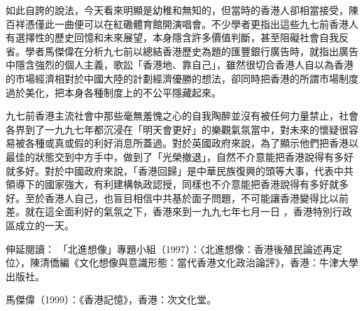 
如此自誇的說法，今天看來明顯是幼稚和無知的，但當時的香港人卻相當接受，陳百祥憑僅此一曲便可以在紅磡體育館開演唱會。不少學者更指出這些九七前香港人有選擇性的歷史回憶和未來展望，本身隱含許多價值判斷，甚至阻礙社會自我反省。學者馬傑偉在分析九七前以總結香港歷史為題的匯豐銀行廣告時，就指出廣告中隱含強烈的個人主義，歌訟「香港地、靠自己」，雖然很切合香港人自以為香港的市場經濟相對於中國大陸的計劃經濟優勝的想法，卻同時把香港的所謂市場制度過於美化，把本身各種制度上的不公平隱藏起來。

九七前香港主流社會中那些毫無羞愧之心的自我陶醉並沒有被任何力量禁止，社會各界到了一九九七年都沉浸在「明天會更好」的樂觀氣氛當中，對未來的懷疑很容易被各種或真或假的利好消息所蓋過。對於英國政府來說，為了顯示他們把香港以最佳的狀態交到中方手中，做到了「光榮撤退」，自然不介意能把香港說得有多好就多好。對於中國政府來說，「香港回歸」是中華民族復興的頭等大事，代表中共領導下的國家強大，有利建構執政認授，同樣也不介意能把香港說得有多好就多好。至於香港人自己，也盲目相信中共基於面子問題，不可能讓香港變得比以前差。就在這全面利好的氣氛之下，香港來到一九九七年七月一日 ，香港特別行政區成立的一天。


伸延閱讀：
「北進想像」專題小組（1997）：〈北進想像：香港後殖民論述再定位〉，陳清僑編《文化想像與意識形態：當代香港文化政治論評》，香港：牛津大學出版社。

馬傑偉（1999）：《香港記憶》，香港：次文化堂。